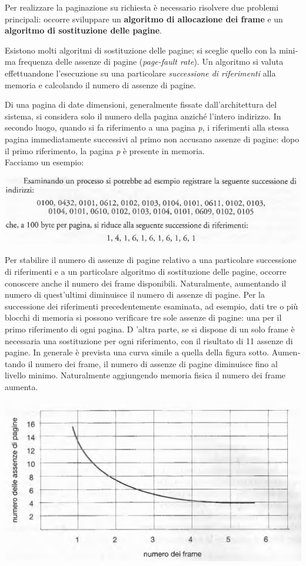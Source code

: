 \documentclass[11pt,a4paper]{article}
\begin{document}
Per realizzare la paginazione su richiesta è necessario risolvere due problemi principali:
occorre sviluppare un \textbf{algoritmo di allocazione dei frame} e un \textbf{algoritmo di sostituzione
delle pagine}.

Esistono molti algoritmi di sostituzione delle pagine; si sceglie quello con la mini­ma frequenza delle assenze di pagine (\emph{page-fault rate}).
Un algoritmo si valuta effettuandone l'esecuzione su una particolare \emph{successione di ri­ferimenti} alla memoria e calcolando il numero di assenze di pagine.

Di una pagina di date dimensioni, generalmente fissate dall'architettura
del sistema, si considera solo il numero della pagina anziché l'intero indirizzo. In secondo
luogo, quando si fa riferimento a una pagina \emph{p}, i riferimenti alla stessa pagina immediata­mente successivi al primo non accusano assenze di pagine: dopo il primo riferimento, la pa­gina \emph{p} è presente in memoria.\medskip\\
Facciamo un esempio:
\begin{center}
  \includegraphics[scale=0.6]{img/0045.png}
\end{center}
Per stabilire il numero di assenze di pagine relativo a una particolare successione di riferi­menti e a un particolare algoritmo di sostituzione delle pagine, occorre conoscere anche il
numero dei frame disponibili. Naturalmente, aumentando il numero di quest'ultimi dimi­nuisce il numero di assenze di pagine. Per la successione dei riferimenti precedentemente
esaminata, ad esempio, dati tre o più blocchi di memoria si possono verificare tre sole assenze di pagine: una per il primo riferimento di ogni pagina. D 'altra parte, se si dispone di
un solo frame è necessaria una sostituzione per ogni riferimento, con il risultato di 11 as­senze di pagine. In generale è prevista una curva simile a quella della figura sotto. Aumen­tando il numero dei frame, il numero di assenze di pagine diminuisce fino al livello minimo.
Naturalmente aggiungendo memoria fisica il numero dei frame aumenta.
\begin{center}
  \includegraphics[scale=0.6]{img/0046.png}
\end{center}
\end{document}

